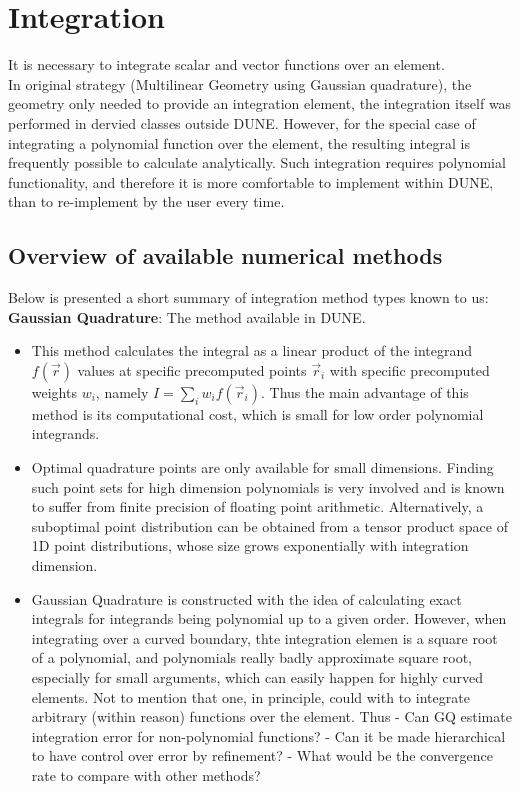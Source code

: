 \section{Integration}

It is necessary to integrate scalar and vector functions over an element. \\

\noindent
In original strategy (Multilinear Geometry using Gaussian quadrature), the geometry only needed to provide an integration element, the integration itself was performed in dervied classes outside DUNE. However, for the special case of integrating a polynomial function over the element, the resulting integral is frequently possible to calculate analytically. Such integration requires polynomial functionality, and therefore it is more comfortable to implement within DUNE, than to re-implement by the user every time.


\subsection{Overview of available numerical methods}

\noindent
Below is presented a short summary of integration method types known to us: \\

\noindent
\textbf{Gaussian Quadrature}: The method available in DUNE.
\begin{itemize}
	\item This method calculates the integral as a linear product of the integrand $f(\vec{r})$ values at specific precomputed points $\vec{r}_i$ with specific precomputed weights $w_i$, namely $I = \sum_i w_i f(\vec{r}_i)$. Thus the main advantage of this method is its computational cost, which is small for low order polynomial integrands.
	\item Optimal quadrature points are only available for small dimensions. Finding such point sets for high dimension polynomials is very involved and is known to suffer from finite precision of floating point arithmetic. Alternatively, a suboptimal point distribution can be obtained from a tensor product space of 1D point distributions, whose size grows exponentially with integration dimension.
	\item Gaussian Quadrature is constructed with the idea of calculating exact integrals for integrands being polynomial up to a given order. However, when integrating over a curved boundary, thte integration elemen is a square root of a polynomial, and polynomials really badly approximate square root, especially for small arguments, which can easily happen for highly curved elements. Not to mention that one, in principle, could with to integrate arbitrary (within reason) functions over the element. Thus
		\subitem - Can GQ estimate integration error for non-polynomial functions?
		\subitem - Can it be made hierarchical to have control over error by refinement?
		\subitem - What would be the convergence rate to compare with other methods?
\end{itemize}

